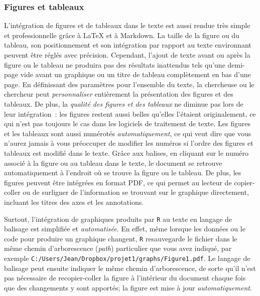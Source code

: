 \documentclass[
  letterpaper,
  DIV=11,
  numbers=noendperiod]{scrreprt}
\begin{document}
\subsubsection{Figures et tableaux}\label{figures-et-tableaux}

L'intégration de figures et de tableaux dans le texte est aussi rendue
très simple et professionnelle grâce à LaTeX et à Markdown. La taille de
la figure ou du tableau, son positionnement et son intégration par
rapport au texte environnant peuvent être réglés avec précision.
Cependant, l'ajout de texte avant ou après la figure ou le tableau ne
produira pas des résultats inattendus tels qu'une demi-page vide avant
un graphique ou un titre de tableau complètement en bas d'une page. En
définissant des paramètres pour l'ensemble du texte, la chercheuse ou le
chercheur peut \emph{personnaliser} entièrement la présentation des
figures et des tableaux. De plus, la \emph{qualité des figures et des
tableaux} ne diminue pas lors de leur intégration~: les figures restent
aussi belles qu'elles l'étaient originalement, ce qui n'est pas toujours
le cas dans les logiciels de traitement de texte. Les figures et les
tableaux sont aussi numérotés \emph{automatiquement}, ce qui veut dire
que vous n'aurez jamais à vous préoccuper de modifier les numéros si
l'ordre des figures et tableaux est modifié dans le texte. Grâce aux
balises, en cliquant sur le numéro associé à la figure ou au tableau
dans le texte, le document se retrouve automatiquement à l'endroit où se
trouve la figure ou le tableau. De plus, les figures peuvent être
intégrées en format PDF, ce qui permet au lecteur de copier-coller ou de
surligner de l'information se trouvant sur le graphique directement,
incluant les titres des axes et les annotations.

Surtout, l'intégration de graphiques produits par \texttt{R} au texte en
langage de balisage est simplifiée et \emph{automatisée}. En effet, même
lorsque les données ou le code pour produire un graphique changent,
\texttt{R} resauvegarde le fichier dans le même chemin d'arborescence
(\emph{path}) particulier que vous avez indiqué, par exemple
\texttt{C:/Users/Jean/Dropbox/projet1/graphs/Figure1.pdf}. Le langage de
balisage peut ensuite indiquer le même chemin d'arborescence, de sorte
qu'il n'est pas nécessaire de recopier-coller la figure à l'intérieur du
document chaque fois que des changements y sont apportés; la figure est
mise à jour \emph{automatiquement}.
\end{document}
